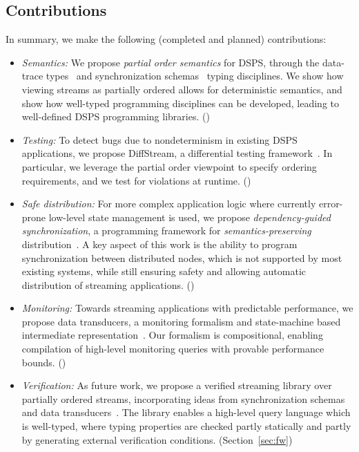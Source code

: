 \subsection{Contributions}

In summary, we make the following (completed and planned) contributions:

\begin{itemize}
\item
\emph{Semantics:}
We propose \emph{partial order semantics} for DSPS,
through the data-trace types~\cite{pldi19} and synchronization schemas~\cite{pods21} typing disciplines.
We show how viewing streams as partially ordered allows for deterministic semantics,
and show how well-typed programming disciplines can be developed,
leading to well-defined DSPS programming libraries.
()

\item
\emph{Testing:}
To detect bugs due to nondeterminism in existing DSPS applications,
we propose DiffStream, a differential testing framework~\cite{oopsla20}.
In particular, we leverage the partial order viewpoint to specify
ordering requirements, and we test for violations at runtime.
()

\item
\emph{Safe distribution:}
For more complex application logic where currently error-prone
low-level state management is used,
we propose \emph{dependency-guided synchronization},
a programming framework for \emph{semantics-preserving} distribution~\cite{arxiv21dgs}.
A key aspect of this work is the ability to program
synchronization between distributed nodes, which is not supported
by most existing systems,
while still ensuring safety and allowing automatic distribution
of streaming applications.
()

\item
\emph{Monitoring:}
Towards streaming applications with predictable performance,
we propose data transducers, a monitoring formalism and state-machine based intermediate representation~\cite{popl19}.
Our formalism is compositional, enabling compilation of high-level
monitoring queries with provable performance bounds.
()

\item
\emph{Verification:}
As future work, we propose a verified streaming library
over partially ordered streams, incorporating ideas from synchronization schemas~\cite{pods21} and data transducers~\cite{popl19}.
The library enables a high-level query language which is well-typed,
where typing properties are checked partly statically and partly by
generating external verification conditions.
(Section~\ref{sec:fw})
\end{itemize}
